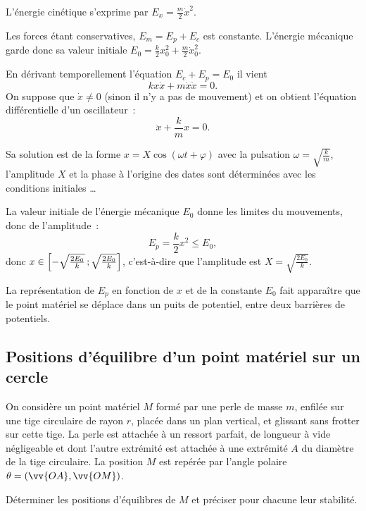 L'énergie cinétique s'exprime par $E_x = \frac{m}{2} \dot{x}^2$.

Les forces étant conservatives, $E_m=E_p+E_c$ est constante. L'énergie mécanique garde donc sa valeur initiale $E_0=\frac{k}{2}x_0^2 + \frac{m}{2}\dot{x}_0^2$.

En dérivant temporellement l'équation $E_c+E_p=E_0$ il vient
\begin{equation}
  k x \dot{x} +m \dot{x}\ddot{x} =0.
\end{equation}
On suppose que $\dot{x} \neq 0$ (sinon il n'y a pas de mouvement) et on obtient l'équation différentielle d'un oscillateur~:
\begin{equation}
  \ddot{x} + \frac{k}{m}x=0.
\end{equation}

Sa solution est de la forme $x=X\cos(\omega t +\varphi)$ avec la pulsation $\omega = \sqrt{\frac{k}{m}}$, l'amplitude $X$ et la phase à l'origine des dates sont déterminées avec les conditions initiales \ldots

La valeur initiale de l'énergie mécanique $E_0$ donne les limites du mouvements, donc de l'amplitude~:
\begin{equation}
  E_p=\frac{k}{2}x^2 \leq E_0,
\end{equation}
donc $x \in \left[ -\sqrt{\frac{2E_0}{k}} \, ;  \sqrt{\frac{2E_0}{k}} \right]$, c'est-à-dire que l'amplitude est $X=\sqrt{\frac{2E_0}{k}}$.

La représentation de $E_p$ en fonction de $x$ et de la constante $E_0$ fait apparaître que le point matériel se déplace dans un puits de potentiel, entre deux barrières de potentiels.

\subsection{Positions d'équilibre d'un point matériel sur un cercle}
\label{chap4-subsec:positionsdequilibredunpointsuruncercle}

On considère un point matériel $M$ formé par une perle de masse $m$, enfilée sur une tige circulaire de rayon $r$, placée dans un plan vertical, et glissant sans frotter sur cette tige. La perle est attachée à un ressort parfait, de longueur à vide négligeable et dont l'autre extrémité est attachée à une extrémité $A$ du diamètre de la tige circulaire. La position $M$ est repérée par l'angle polaire $\theta = (\vv{OA}, \vv{OM})$. 

Déterminer les positions d'équilibres de $M$ et préciser pour chacune leur stabilité.

